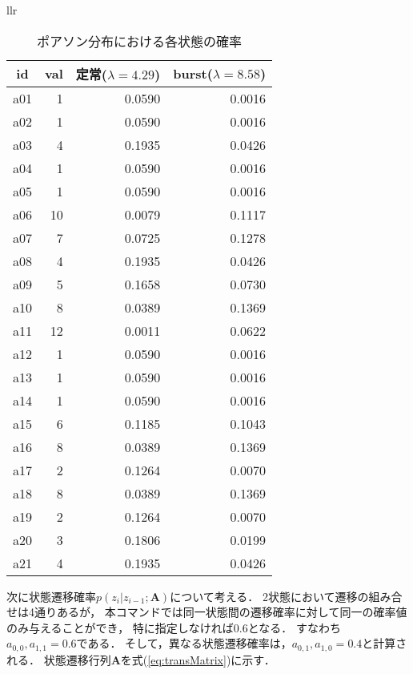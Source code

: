 \begin{table}[htbp]
\begin{center}
\begin{tabular}{llr}

\begin{minipage}{0.45\hsize}
\begin{center}
\caption{ポアソン分布における各状態の確率\label{tbl:poiProb}}
{\small
\begin{tabular}{crrr}
\hline
id&val&定常($\lambda=4.29$)&burst($\lambda=8.58$) \\
\hline
a01& 1&0.0590 & 0.0016\\
a02& 1&0.0590 & 0.0016\\
a03& 4&0.1935 & 0.0426\\
a04& 1&0.0590 & 0.0016\\
a05& 1&0.0590 & 0.0016\\
a06&10&0.0079 & 0.1117\\
a07& 7&0.0725 & 0.1278\\
a08& 4&0.1935 & 0.0426\\
a09& 5&0.1658 & 0.0730\\
a10& 8&0.0389 & 0.1369\\
a11&12&0.0011 & 0.0622\\
a12& 1&0.0590 & 0.0016\\
a13& 1&0.0590 & 0.0016\\
a14& 1&0.0590 & 0.0016\\
a15& 6&0.1185 & 0.1043\\
a16& 8&0.0389 & 0.1369\\
a17& 2&0.1264 & 0.0070\\
a18& 8&0.0389 & 0.1369\\
a19& 2&0.1264 & 0.0070\\
a20& 3&0.1806 & 0.0199\\
a21& 4&0.1935 & 0.0426\\
\hline
\end{tabular} 
}
\end{center}
\end{minipage}

\end{tabular} 
\end{center}
\end{table} 


次に状態遷移確率$p(z_i|z_{i-1};\mathbf{A})$について考える．
2状態において遷移の組み合せは4通りあるが，
本コマンドでは同一状態間の遷移確率に対して同一の確率値のみ与えることができ，
特に指定しなければ0.6となる．
すなわち$a_{0,0},a_{1,1}=0.6$である．
そして，異なる状態遷移確率は，$a_{0,1},a_{1,0}=0.4$と計算される．
状態遷移行列$\mathbf{A}$を式(\ref{eq:transMatrix})に示す．

